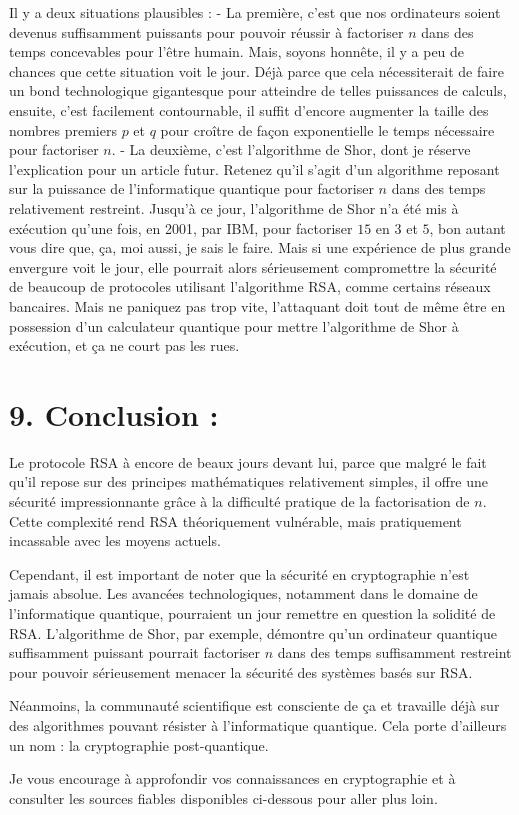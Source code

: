 \documentclass[
  paper=a4,
  ,captions=tableheading
]{scrartcl}
\begin{document}
Il y a deux situations plausibles : - La première, c'est que nos
ordinateurs soient devenus suffisamment puissants pour pouvoir réussir à
factoriser \(n\) dans des temps concevables pour l'être humain. Mais,
soyons honnête, il y a peu de chances que cette situation voit le jour.
Déjà parce que cela nécessiterait de faire un bond technologique
gigantesque pour atteindre de telles puissances de calculs, ensuite,
c'est facilement contournable, il suffit d'encore augmenter la taille
des nombres premiers \(p\) et \(q\) pour croître de façon exponentielle
le temps nécessaire pour factoriser \(n\). - La deuxième, c'est
l'algorithme de Shor, dont je réserve l'explication pour un article
futur. Retenez qu'il s'agit d'un algorithme reposant sur la puissance de
l'informatique quantique pour factoriser \(n\) dans des temps
relativement restreint. Jusqu'à ce jour, l'algorithme de Shor n'a été
mis à exécution qu'une fois, en 2001, par IBM, pour factoriser \(15\) en
\(3\) et \(5\), bon autant vous dire que, ça, moi aussi, je sais le
faire. Mais si une expérience de plus grande envergure voit le jour,
elle pourrait alors sérieusement compromettre la sécurité de beaucoup de
protocoles utilisant l'algorithme RSA, comme certains réseaux bancaires.
Mais ne paniquez pas trop vite, l'attaquant doit tout de même être en
possession d'un calculateur quantique pour mettre l'algorithme de Shor à
exécution, et ça ne court pas les rues.

\section{9. Conclusion :}\label{conclusion}

Le protocole RSA à encore de beaux jours devant lui, parce que malgré le
fait qu'il repose sur des principes mathématiques relativement simples,
il offre une sécurité impressionnante grâce à la difficulté pratique de
la factorisation de \(n\). Cette complexité rend RSA théoriquement
vulnérable, mais pratiquement incassable avec les moyens actuels.

Cependant, il est important de noter que la sécurité en cryptographie
n'est jamais absolue. Les avancées technologiques, notamment dans le
domaine de l'informatique quantique, pourraient un jour remettre en
question la solidité de RSA. L'algorithme de Shor, par exemple, démontre
qu'un ordinateur quantique suffisamment puissant pourrait factoriser
\(n\) dans des temps suffisamment restreint pour pouvoir sérieusement
menacer la sécurité des systèmes basés sur RSA.

Néanmoins, la communauté scientifique est consciente de ça et travaille
déjà sur des algorithmes pouvant résister à l'informatique quantique.
Cela porte d'ailleurs un nom : la cryptographie post-quantique.

Je vous encourage à approfondir vos connaissances en cryptographie et à
consulter les sources fiables disponibles ci-dessous pour aller plus
loin.
\end{document}
